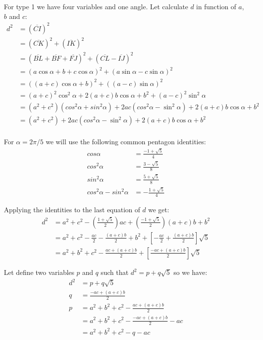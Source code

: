 \documentclass[11pt]{article}
\begin{document}
For type 1 we have four variables and one angle. Let calculate $d$ in function of $a$, $b$ and $c$:
\begin{align*}
d^2 &= (\overline{CI})^2\\
    &= (\overline{CK})^2 + (\overline{IK})^2\\
    &= (\overline{BL} + \overline{BF} + \overline{FJ})^2 + (\overline{CL} - \overline{IJ})^2\\
    &= (a\cos{\alpha} + b + c\cos{\alpha})^2 + (a\sin{\alpha} - c\sin{\alpha})^2\\
    &= ((a+c)\cos{\alpha} + b)^2 + ((a-c)\sin{\alpha})^2\\
    &= (a+c)^2\cos^2{\alpha} + 2(a+c)b\cos{\alpha} + b^2 + (a-c)^2\sin^2{\alpha}\\
    &= (a^2+c^2)(cos^2{\alpha}+sin^2{\alpha}) + 2ac(cos^2{\alpha}-\sin^2{\alpha})+ 2(a+c)b\cos{\alpha} + b^2\\
    &= (a^2+c^2) + 2ac(cos^2{\alpha}-\sin^2{\alpha})+ 2(a+c)b\cos{\alpha} + b^2\\
\end{align*}

For $\alpha = 2\pi / 5$ we will use the following common pentagon identities:
\begin{align*}
cos{\alpha}   &= \frac{-1 + \sqrt{5}}{4} \\
cos^2{\alpha} &= \frac{{ 3 - \sqrt{5}}}{8} \\
sin^2{\alpha} &= \frac{5 + \sqrt{5}}{8} \\
cos^2{\alpha} - sin^2{\alpha} &= -\frac{1 + \sqrt{5}}{4}
\end{align*}

Applying the identities to the last equation of $d$ we get:
\begin{align*}
d^2 &= a^2 + c^2 - (\frac{1 + \sqrt{5}}{2})ac + (\frac{-1 + \sqrt{5}}{2})(a+c)b + b^2\\
    &= a^2 + c^2 - \frac{ac}{2} - \frac{(a+c)b}{2} + b^2 + [- \frac{ac}{2} + \frac{(a+c)b}{2}]\sqrt{5}\\
    &= a^2 + b^2 + c^2 - \frac{ac + (a+c)b}{2} + [\frac{-ac + (a+c)b}{2}]\sqrt{5}
\end{align*}

Let define two variables $p$ and $q$ such that $d^2 = p + q\sqrt{5}$ so we have:
\begin{align*}
d^2 &= p + q\sqrt{5}\\
  q &= \frac{-ac + (a + c)b}{2}\\
  p &= a^2 + b^2 + c^2 - \frac{ac + (a+c)b}{2}\\
    &= a^2 + b^2 + c^2 - \frac{-ac + (a+c)b}{2} - ac\\
    &= a^2 + b^2 + c^2 - q - ac
\end{align*}
\end{document}
